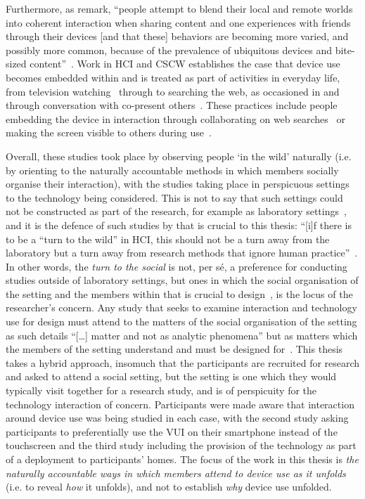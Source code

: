 \begin{revisedsubmission}
Furthermore, as \citet{Isaacs2012} remark, ``people attempt to blend their local and remote worlds into
coherent interaction when sharing content and one experiences with friends through their devices [and that these] behaviors are becoming more varied, and possibly more common, because of the prevalence of ubiquitous devices and bite-sized content''~\citep[p. 625]{Isaacs2012}.
Work in \ac{HCI} and \ac{CSCW} establishes the case that device use becomes embedded within and is treated as part of activities in everyday life, from television watching~\citep{Rooksby2015} through to searching the web, as occasioned in and through conversation with co-present others~\citep{Brown2015}.
These practices include people embedding the device in interaction through collaborating on web searches~\citep{Brown2015} or making the screen visible to others during use~\citep{Raclaw2016}.

Overall, these studies took place by observing people `in the wild' naturally (i.e. by orienting to
the naturally accountable methods in which members socially organise their interaction), with the studies taking place in perspicuous settings~\citep[pp. 181--182]{Garfinkel2002} to the technology being considered.
This is not to say that such settings could not be constructed as part of the research, for example as laboratory settings~\citep{Rooksby2013}\label{line:labsettings}, and it is the defence of such studies by \citet{Rooksby2013} that is crucial to this thesis: ``[i]f there is to be a ``turn to the wild'' in HCI, this should not be a turn away from the laboratory but a turn away from research methods that ignore human practice''~\citep[p. 1]{Rooksby2013}.
In other words, the \textit{turn to the social} is not, per s\'{e}, a preference for conducting studies outside of laboratory settings, but ones in which the social organisation of the setting and the members within that is crucial to design~\citep{Crabtree2009}, is the locus of the researcher's concern.
Any study that seeks to examine interaction and technology use for design must attend to the matters of the social organisation of the setting as such details ``[\ldots] matter and not as analytic phenomena'' but as matters which the members of the setting understand and must be designed for~\citep[p. 137]{Crabtree2012}.
This thesis takes a hybrid approach, insomuch that the participants are recruited for research and asked to attend a social setting, but the setting is one which they would typically visit together for a research study, and is of perspicuity for the technology interaction of concern.
Participants were made aware that interaction around device use was being studied in each case, with the second study asking participants to preferentially use the \ac{VUI} on their smartphone instead of the touchscreen and the third study including the provision of the technology as part of a deployment to participants' homes.
The focus of the work in this thesis is \textit{the naturally accountable ways in which members attend to device use as it unfolds }(i.e. to reveal \textit{how} it unfolds), and not to establish \textit{why} device use unfolded.
\end{revisedsubmission}

